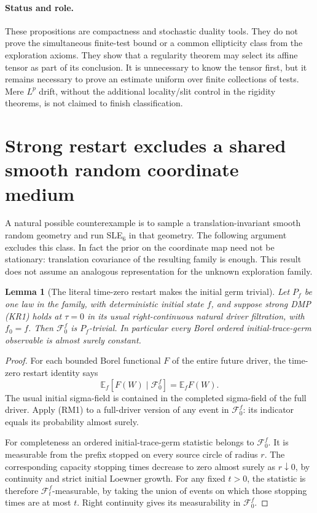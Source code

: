\documentclass[11pt]{article}
\newtheorem{lemma}[theorem]{Lemma}
\theoremstyle{definition}\newtheorem{definition}[theorem]{Definition}
\theoremstyle{remark}\newtheorem{remark}[theorem]{Remark}
\begin{document}
\paragraph{Status and role.}
These propositions are compactness and stochastic duality tools.
They do not prove the simultaneous finite-test bound or a common
ellipticity class from the exploration axioms. They show that a regularity
theorem may select its affine tensor as part of its conclusion.
It is unnecessary to know the tensor first, but it remains
necessary to prove an estimate uniform over finite collections
of tests. Mere $L^p$ drift, without the additional locality/slit
control in the rigidity theorems, is not claimed to finish
classification.


\section{Strong restart excludes a shared smooth random coordinate medium}
\label{sec:random-smooth-medium-rigidity}

A natural possible counterexample is to sample a translation-invariant
smooth random geometry and run SLE$_6$ in that geometry.  The following
argument excludes this class. In fact the prior on the coordinate map
need not be stationary: translation covariance of the resulting family
is enough. This result does not assume an analogous representation for
the unknown exploration family.

\begin{lemma}[The literal time-zero restart makes the initial germ trivial]
\label{lem:dmp-zero-germ}
Let $P_f$ be one law in the family, with deterministic initial state $f$,
and suppose strong DMP (KR1) holds at $\tau=0$ in its usual
right-continuous natural driver filtration, with $f_0=f$. Then
$\mathcal F^f_0$ is $P_f$-trivial. In particular every Borel ordered
initial-trace-germ observable is almost surely constant.
\end{lemma}
\begin{proof}
For each bounded Borel functional $F$ of the entire future driver,
the time-zero restart identity says
\[
 \mathbb E_f[F(W)\mid\mathcal F^f_0]=\mathbb E_fF(W).
 \tag{RM1}
\]
The usual initial sigma-field is contained in the completed sigma-field
of the full driver. Apply (RM1) to a full-driver version of any event in
$\mathcal F^f_0$: its indicator equals its probability almost surely.

For completeness an ordered initial-trace-germ statistic belongs to
$\mathcal F^f_0$. It is measurable from the prefix stopped on every
source circle of radius $r$. The corresponding capacity stopping times
decrease to zero almost surely as $r\downarrow0$, by continuity and
strict initial Loewner growth. For any fixed $t>0$, the statistic is
therefore $\mathcal F^f_t$-measurable, by taking the union of events on
which those stopping times are at most $t$. Right continuity gives its
measurability in $\mathcal F^f_0$.
\end{proof}
\end{document}
